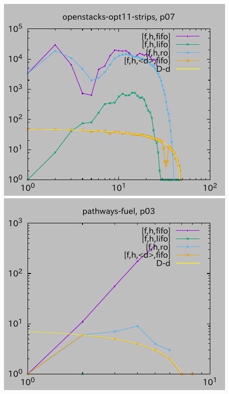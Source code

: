 \includegraphics{img/depth/openstacks-opt11-strips/p07.pdf}
\includegraphics{img/depth/pathways-fuel/p03.pdf}

